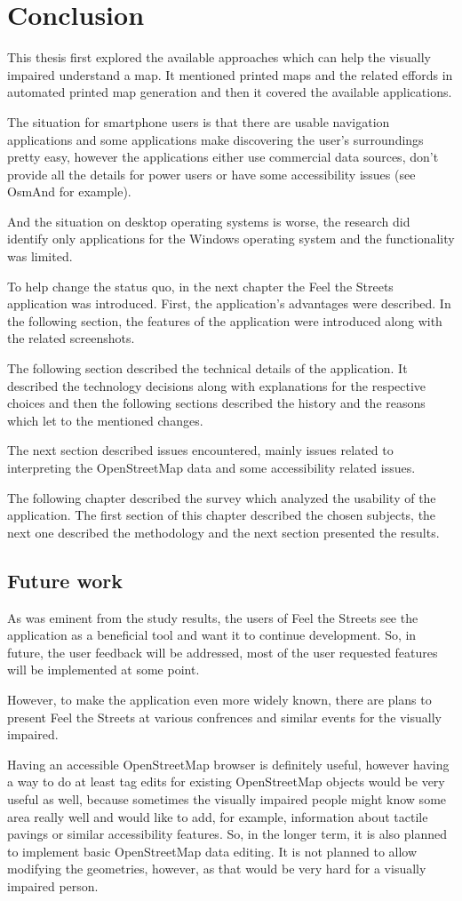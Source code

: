 \documentclass[nolof,digital]{fithesis3}
\begin{document}
\chapter{Conclusion}
This thesis first explored the available approaches which can help the visually impaired understand a map. It mentioned printed maps and the related effords in automated printed map generation and then it covered the available applications.

The situation for smartphone users is that there are usable navigation applications and some applications make discovering the user's surroundings pretty easy, however the applications either use commercial data sources, don't provide all the details for power users or have some accessibility issues (see OsmAnd for example).

And the situation on desktop operating systems is worse, the research did identify only applications for the Windows operating system and the functionality was limited.

To help change the status quo, in the next chapter the Feel the Streets application was introduced. First, the application's advantages were described. In the following section, the features of the application were introduced along with the related screenshots.

The following section described the technical details of the application. It described the technology decisions along with explanations for the respective choices and then the following sections described the history and the reasons which let to the mentioned changes.

The next section described issues encountered, mainly issues related to interpreting the OpenStreetMap data and some accessibility related issues.

The following chapter described the survey which analyzed the usability of the application. The first section of this chapter described the chosen subjects, the next one described the methodology and the next section presented the results.
\section{Future work}
As was eminent from the study results, the users of Feel the Streets see the application as a beneficial tool and want it to continue development. So, in future, the user feedback will be addressed, most of the user requested features will be implemented at some point.

However, to make the application even more widely known, there are plans to present Feel the Streets at various confrences and similar events for the visually impaired.

Having an accessible OpenStreetMap browser is definitely useful, however having a way to do at least tag edits for existing OpenStreetMap objects would be very useful as well, because sometimes the visually impaired people might know some area really well and would like to add, for example, information about tactile pavings or similar accessibility features. So, in the longer term, it is also planned to implement basic OpenStreetMap data editing. It is not planned to allow modifying the geometries, however, as that would be very hard for a visually impaired person.
\printbibliography
\end{document}
